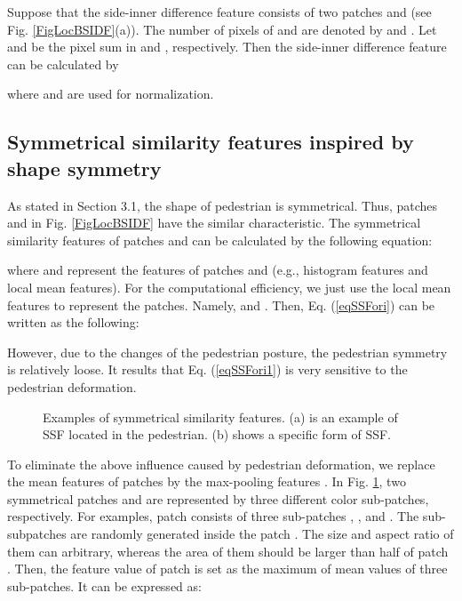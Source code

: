 \documentclass[10pt,twocolumn,letterpaper]{article}
\begin{document}
Suppose that the side-inner difference feature  consists of two patches  and  (see Fig. \ref{FigLocBSIDF}(a)). The number of pixels of  and  are denoted by  and . Let  and  be the pixel sum in  and , respectively. Then the side-inner difference feature  can be calculated by

where  and  are used for normalization. 

\subsection{Symmetrical similarity features inspired by shape symmetry}
As stated in Section 3.1, the shape of pedestrian is symmetrical. Thus, 
patches  and  in Fig. \ref{FigLocBSIDF} have the 
similar characteristic. The symmetrical similarity features 
 of patches  and  can be calculated by the following equation:

where  and  represent the features of patches 
 and  (e.g., histogram features and local mean features). For the 
computational efficiency, we just use the local mean features to represent the patches. 
Namely,  and . Then, Eq. (\ref{eqSSFori}) can 
be written as the following:


However, due to the changes of the pedestrian posture, the pedestrian symmetry  is relatively loose. It results that Eq. (\ref{eqSSFori1}) is very sensitive to 
the pedestrian deformation. 

\begin{figure}[!t]
\centering
{}
\hfil
{}
\caption{Examples of symmetrical similarity features. (a) is an example of SSF located in the pedestrian. (b) shows a specific form of SSF.}
\label{FigSSF}
\end{figure}

To eliminate the above influence caused by pedestrian deformation, we 
replace the mean features of patches by the max-pooling features \cite{Wang_Regionlets_ICCV_2013}. In 
Fig. \ref{FigSSF}, two symmetrical patches  and  are 
represented by three different color sub-patches, respectively. For 
examples, patch  consists of three sub-patches , , and . The sub-subpatches are randomly generated inside the patch . The size and aspect ratio of them can arbitrary, whereas the 
area of them should be larger than half of patch . Then, the feature value of patch 
 is set as the maximum of mean values of three sub-patches. It can be 
expressed as:
\end{document}

